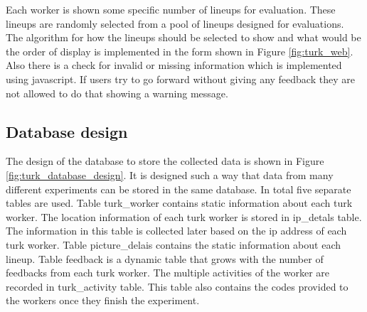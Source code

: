 \documentclass[11pt]{article}
\begin{document}
Each worker is shown some specific number of lineups for evaluation. These lineups are randomly selected from a pool of lineups designed for evaluations. The algorithm for how the lineups should be selected to show and what would be the order of display is implemented in the form shown in Figure \ref{fig:turk_web}. Also there is a check for invalid or missing information which is implemented using javascript. If users try to go forward without giving any feedback they are not allowed to do that showing a warning message.



\subsection{Database design} The design of the database to store the collected data is shown in Figure \ref{fig:turk_database_design}. It is designed such a way that data from many different experiments can be stored in the same database. In total five separate tables are used. Table turk\_worker contains static information about each turk worker. The location information of each turk worker is stored in ip\_detals table. The information in this table is collected later based on the ip address of each turk worker. Table picture\_delais contains the static information about each lineup. Table feedback is a dynamic table that grows with the number of feedbacks from each turk worker. The multiple activities of the worker are recorded in turk\_activity table. This table also contains the codes provided to the workers once they finish the experiment. 
\end{document}
